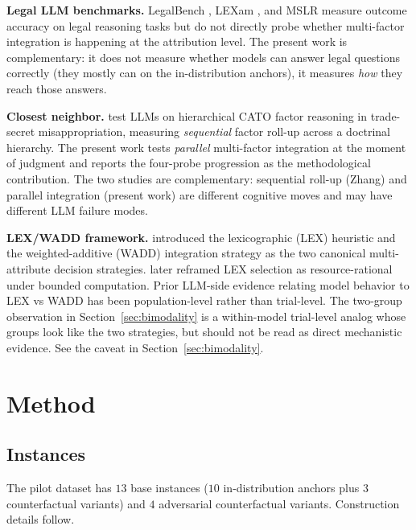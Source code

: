 \documentclass[11pt]{article}
\begin{document}
\textbf{Legal LLM benchmarks.} LegalBench \citep{guha2023}, LEXam \citep{katz2025}, and MSLR \citep{yu2025} measure outcome accuracy on legal reasoning tasks but do not directly probe whether multi-factor integration is happening at the attribution level. The present work is complementary: it does not measure whether models can answer legal questions correctly (they mostly can on the in-distribution anchors), it measures \emph{how} they reach those answers.

\textbf{Closest neighbor.} \citet{zhang2025} test LLMs on hierarchical CATO factor reasoning in trade-secret misappropriation, measuring \emph{sequential} factor roll-up across a doctrinal hierarchy. The present work tests \emph{parallel} multi-factor integration at the moment of judgment and reports the four-probe progression as the methodological contribution. The two studies are complementary: sequential roll-up (Zhang) and parallel integration (present work) are different cognitive moves and may have different LLM failure modes.

\textbf{LEX/WADD framework.} \citet{payne1993} introduced the lexicographic (LEX) heuristic and the weighted-additive (WADD) integration strategy as the two canonical multi-attribute decision strategies. \citet{lieder2020} later reframed LEX selection as resource-rational under bounded computation. Prior LLM-side evidence relating model behavior to LEX vs WADD has been population-level rather than trial-level. The two-group observation in Section~\ref{sec:bimodality} is a within-model trial-level analog whose groups look like the two strategies, but should not be read as direct mechanistic evidence. See the caveat in Section~\ref{sec:bimodality}.

\section{Method}

\subsection{Instances}

The pilot dataset has $13$ base instances ($10$ in-distribution anchors plus $3$ counterfactual variants) and $4$ adversarial counterfactual variants. Construction details follow.
\end{document}
